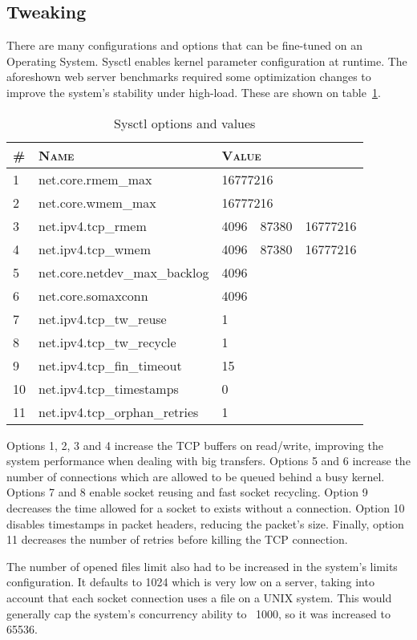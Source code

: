\subsection{Tweaking}
There are many configurations and options that can be fine-tuned on an Operating System. Sysctl enables kernel parameter configuration at runtime. The aforeshown web server benchmarks required some optimization changes to improve the system's stability under high-load. These are shown on table~\ref{tab:sysctl}.
\begin{table}[ht]
  \centering
  
  \begin{tabular}{p{}|p{}|p{}}
    \textsc{\#} 
  & \textsc{Name}
  & \textsc{Value} \\
  \hline
  1 & net.core.rmem\_max & 16777216 \\
  2 & net.core.wmem\_max & 16777216 \\
  3 & net.ipv4.tcp\_rmem & 4096~\, 87380~\, 16777216 \\  
  4 & net.ipv4.tcp\_wmem & 4096~\, 87380~\, 16777216 \\
  5 & net.core.netdev\_max\_backlog & 4096 \\
  6 & net.core.somaxconn & 4096 \\
  7 & net.ipv4.tcp\_tw\_reuse & 1 \\
  8 & net.ipv4.tcp\_tw\_recycle & 1 \\
  9 & net.ipv4.tcp\_fin\_timeout & 15 \\
  10 & net.ipv4.tcp\_timestamps & 0 \\
  11 & net.ipv4.tcp\_orphan\_retries & 1 \\
  
  \end{tabular}
  \caption{Sysctl options and values}
  \label{tab:sysctl}
\end{table}
Options 1, 2, 3 and 4 increase the TCP buffers on read/write, improving the system performance when dealing with big transfers. Options 5 and 6 increase the number of connections which are allowed to be queued behind a busy kernel. Options 7 and 8 enable socket reusing and fast socket recycling. Option 9 decreases the time allowed for a socket to exists without a connection. Option 10 disables timestamps in packet headers, reducing the packet's size. Finally, option 11 decreases the number of retries before killing the TCP connection.

The number of opened files limit also had to be increased in the system's limits configuration. It defaults to 1024 which is very low on a server, taking into account that each socket connection uses a file on a UNIX system. This would generally cap the system's concurrency ability to ~1000, so it was increased to 65536.

